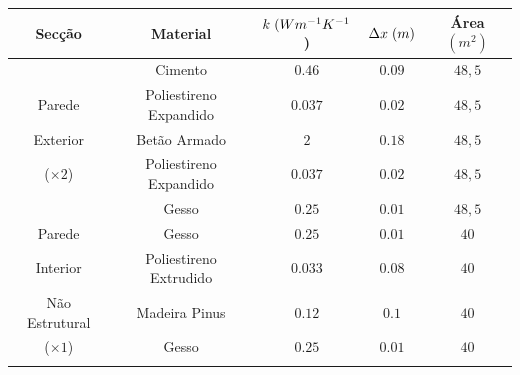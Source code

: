 \documentclass[12pt, a4paper]{article}
\begin{document}
\pagebreak
\begin{table}[htpb]
	\begin{center}
		\begin{tabular}{c c c c c}
			\toprule{}
			Secção                     & Material               & $ k \hspace{1mm} (Wm^{-1}K^{-1}$) & $ \Delta x \hspace{1mm} (m)$ & Área $(m^2) $ \\
				\midrule{}

			\multirow{5}{*}{}          & Cimento                & $0.46$                            & $0.09$                       & $48,5$          \\
				\cline{2-5}
			Parede                     & Poliestireno Expandido & $0.037$                           & $0.02$                       & $48,5$          \\
				\cline{2-5}
			Exterior                   & Betão Armado           & $2$                               & $0.18$                       & $48,5$          \\
				\cline{2-5}
			($\times 2$)               & Poliestireno Expandido & $0.037$                           & $0.02$                       & $48,5$          \\
				\cline{2-5}
			                           & Gesso                  & $0.25$                            & $0.01$                       & $48,5$          \\
				\midrule{}

			Parede \multirow{4}{*}{}   & Gesso                  & $0.25$                            & $0.01$                       & $40$          \\
				\cline{2-5}
			Interior                   & Poliestireno Extrudido & $0.033$                           & $0.08$                       & $40$          \\
				\cline{2-5}
			Não Estrutural             & Madeira Pinus          & $0.12$                            & $0.1$                        & $40$          \\
				\cline{2-5}
			($\times 1$)               & Gesso                  & $0.25$                            & $0.01$                       & $40$          \\
				\midrule{}


\end{tabular}
\end{center}
\end{table}
\end{document}
